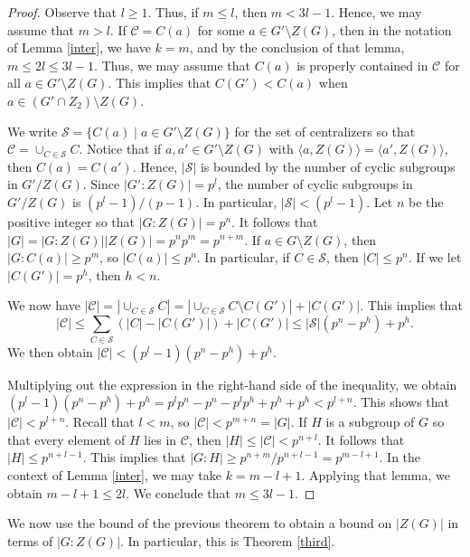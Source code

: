 \begin{proof}
Observe that $l \ge 1$.  Thus, if $m \le l$, then $m < 3l - 1$.  Hence, we may assume that $m > l$.  If ${\mathcal C} = C (a)$ for some $a \in G' \setminus Z (G)$, then in the notation of Lemma \ref{inter}, we have $k = m$, and by the conclusion of that lemma, $m \le 2l \le 3l - 1$.  Thus, we may assume that $C (a)$ is properly contained in ${\mathcal C}$ for all $a \in G' \setminus Z (G)$.  This implies that $C (G') < C (a)$ when $a \in (G' \cap Z_2) \setminus Z (G)$.

We write ${\mathcal S} = \{ C (a) \mid a \in G' \setminus Z (G) \}$ for the set of centralizers so that ${\mathcal C} = \cup_{C \in {\mathcal S}} C$.  Notice that if $a, a' \in G' \setminus Z (G)$ with $\langle a, Z(G) \rangle = \langle a', Z(G) \rangle$, then $C (a) = C (a')$.  Hence, $|{\mathcal S}|$ is bounded by the number of cyclic subgroups in $G'/Z (G)$.  Since $|G':Z (G)| = p^l$, the number of cyclic subgroups in $G'/Z (G)$ is $(p^l - 1)/(p-1)$.  In particular, $|{\mathcal S}| < (p^l - 1)$.  Let $n$ be the positive integer so that $|G:Z (G)| = p^n$.  It follows that $|G| = |G:Z (G)||Z (G)| = p^n p^m = p^{n+m}$.  If $a \in G \setminus Z(G)$, then $|G:C (a)| \ge p^m$, so $|C (a)| \le p^n$.  In particular, if $C \in {\mathcal S}$, then $|C| \le p^n$.  If we let $|C (G')| = p^h$, then $h < n$.

We now have $|{\mathcal C}| = |\cup_{C \in {\mathcal S}} C| = |\cup_{C \in {\mathcal S}} C \setminus C (G')| + |C (G')|$.  This implies that
$$
|{\mathcal C}| \le \sum_{C \in {\mathcal S}} \left(|C| - |C (G')|\right) + |C (G')| \le |{\mathcal S}|(p^n - p^h) + p^h.
$$
We then obtain $|{\mathcal C}| < (p^l - 1)(p^n - p^h) + p^h.$

Multiplying out the expression in the right-hand side of the inequality, we obtain $(p^l - 1)(p^n - p^h) + p^h = p^l p^n - p^n - p^l p^h + p^h + p^h < p^{l+n}$.  This shows that $|{\mathcal C}| < p^{l+n}$.  Recall that $l < m$, so $|{\mathcal C}| < p^{m+n} = |G|$.  If $H$ is a subgroup of $G$ so that every element of $H$ lies in ${\mathcal C}$, then $|H| \le |{\mathcal C}| < p^{n+l}$.  It follows that $|H| \le p^{n+l-1}$.  This implies that $|G:H| \ge p^{n+m}/p^{n+l-1} = p^{m-l+1}$.  In the context of Lemma \ref{inter}, we may take $k = m-l+1$.
Applying that lemma, we obtain $m - l + 1 \le 2l$.  We conclude that $m \le 3l - 1$.
\end{proof}

We now use the bound of the previous theorem to obtain a bound on $|Z (G)|$ in terms of $|G:Z (G)|$.  In particular, this is Theorem \ref{third}.

